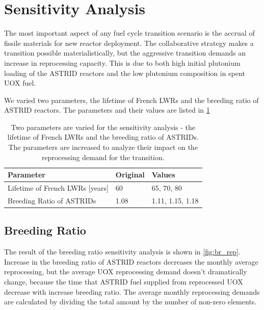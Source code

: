 \section{Sensitivity Analysis}

The most important aspect of any fuel cycle transition scenario
is the accrual of fissile materials for new reactor deployment.
The collaborative strategy makes a transition possible materialistically,
but the aggressive transition demands an increase in reprocessing capacity.
This is due to both high initial plutonium loading of the \gls{ASTRID}
reactors and the low plutonium composition in spent \gls{UOX} fuel.

We varied two parameters, the lifetime of French \glspl{LWR} and the
breeding ratio of \gls{ASTRID} reactors. The parameters and their values
are listed in \cref{tab:sen_par}

\begin{table}[h]
    \centering
    \begin{tabularx}{\textwidth}{lbb}
        \hline
        \textbf{Parameter} & \textbf{Original} & \textbf{Values} \\
        \hline
        Lifetime of French \glspl{LWR} [years] & 60  & 65, 70, 80 \\
        Breeding Ratio of \glspl{ASTRID} & 1.08 & 1.11, 1.15, 1.18 \\ 
        \hline
    \end{tabularx}
    \caption {Two parameters are varied for the sensitivity analysis - the 
              lifetime of French \glspl{LWR} and the breeding ratio of \glspl{ASTRID}.
              The parameters are increased to analyze their impact on the reprocessing
              demand for the transition.}
    \label{tab:sen_par}
\end{table}

\subsection{Breeding Ratio}

The result of the breeding ratio sensitivity analysis is shown in
\cref{fig:br_rep}.
Increase in the breeding ratio of \gls{ASTRID} reactors
decreases the monthly average reprocessing, but the 
average \gls{UOX} reprocessing demand doesn't dramatically change,
because the time that \gls{ASTRID} fuel supplied from reprocessed
\gls{UOX} decrease with increase breeding ratio. The average monthly reprocessing
demands are calculated by dividing the total amount by the number of non-zero elements.

